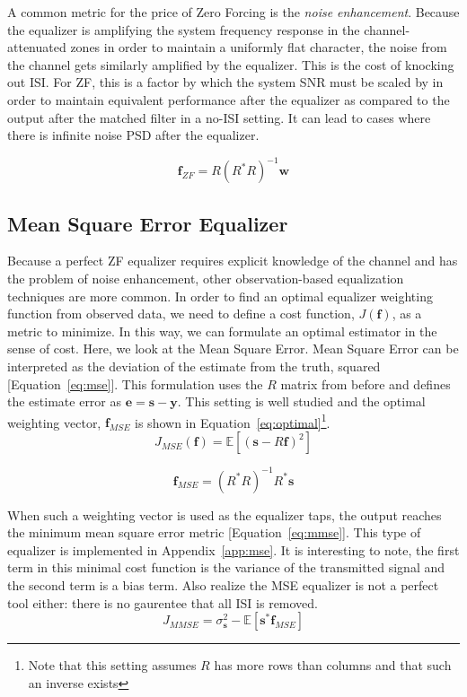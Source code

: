 \documentclass[]{article}
\begin{document}
A common metric for the price of Zero Forcing is the \emph{noise enhancement}.  Because the equalizer is amplifying the system frequency response in the channel-attenuated zones in order to maintain a uniformly flat character, the noise from the channel gets similarly amplified by the equalizer.  This is the cost of knocking out ISI.  For ZF, this is a factor by which the system SNR must be scaled by in order to maintain equivalent performance after the equalizer as compared to the output after the matched filter in a no-ISI setting.  It can lead to cases where there is infinite noise PSD after the equalizer.

\begin{equation}
\label{eq:zf} 
\mathbf{f}_{ZF} = R \left(R^{\ast}R \right)^{-1} \mathbf{w}
\end{equation}

\subsection{Mean Square Error Equalizer}
\label{sec:optimal}
Because a perfect ZF equalizer requires explicit knowledge of the channel and has the problem of noise enhancement, other observation-based equalization techniques are more common.  In order to find an optimal equalizer weighting function from observed data, we need to define a cost function, $J(\mathbf{f})$, as a metric to minimize.  In this way, we can formulate an optimal estimator in the sense of cost.  Here, we look at the Mean Square Error.  Mean Square Error can be interpreted as the deviation of the estimate from the truth, squared [Equation~\ref{eq:mse}].  This formulation uses the $R$ matrix from before and defines the estimate error as $\mathbf{e} = \mathbf{s} - \mathbf{y}$.  This setting is well studied and the optimal weighting vector, $\mathbf{f}_{MSE}$ is shown in Equation~\ref{eq:optimal}\footnote{Note that this setting assumes $R$ has more rows than columns and that such an inverse exists}.
\begin{equation}
\label{eq:mse} 
J_{MSE} \left( \mathbf{f}\right) = \mathbb{E} \left[ \left(\mathbf{s} - R \mathbf{f} \right)^2 \right]
\end{equation}

\begin{equation}
\label{eq:optimal}
\mathbf{f}_{MSE} = \left(R^{\ast}R\right)^{-1}R^{\ast}\mathbf{s}
\end{equation}

When such a weighting vector is used as the equalizer taps, the output reaches the minimum mean square error metric  [Equation~\ref{eq:mmse}].  This type of equalizer is implemented in Appendix~\ref{app:mse}. It is interesting to note, the first term in this minimal cost function is the variance of the transmitted signal and the second term is a bias term.  Also realize the MSE equalizer is not a perfect tool either: there is no gaurentee that all ISI is removed.
\begin{equation}
\label{eq:mmse}
J_{MMSE} =  \sigma_{\mathbf{s}}^{2} - \mathbb{E} \left[ \mathbf{s}^{\ast} \mathbf{f}_{MSE} \right]
\end{equation}
\end{document}
